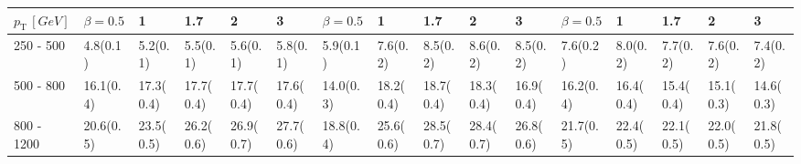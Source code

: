 \begin{table}
{\begin{tabular}{llllllllllllllll}
\multicolumn{1}{l||}{$p_{\mathrm{T}} \, [GeV]$} & \multicolumn{1}{l|}{\cellcolor{Gray2}$\beta=0.5$} & \multicolumn{1}{l|}{\cellcolor{Gray2}1}        & \multicolumn{1}{l|}{\cellcolor{Gray2}1.7}    & \multicolumn{1}{l|}{\cellcolor{Gray2}2}    & \multicolumn{1}{l||}{\cellcolor{Gray2}3}    & \multicolumn{1}{l|}{\cellcolor{Gray2}$\beta=0.5$} & \multicolumn{1}{l|}{\cellcolor{Gray2}1}    & \multicolumn{1}{l|}{\cellcolor{Gray2}1.7}  & \multicolumn{1}{l|}{\cellcolor{Gray2}2}    & \multicolumn{1}{l||}{\cellcolor{Gray2}3}    & \multicolumn{1}{l|}{\cellcolor{Gray2}$\beta=0.5$} & \multicolumn{1}{l|}{\cellcolor{Gray2}1}    & \multicolumn{1}{l|}{\cellcolor{Gray2}1.7}  & \multicolumn{1}{l|}{\cellcolor{Gray2}2}    & \multicolumn{1}{l|}{\cellcolor{Gray2}3}    \\ \hline \hline
\multicolumn{1}{l||}{250 - 500}      & \multicolumn{1}{l|}{4.8(0.1)}         & \multicolumn{1}{l|}{5.2(0.1)}  & \multicolumn{1}{l|}{5.5(0.1)}        & \multicolumn{1}{l|}{5.6(0.1)}  				& \multicolumn{1}{l||}{5.8(0.1)}    & \multicolumn{1}{l|}{5.9(0.1)}         	& \multicolumn{1}{l|}{7.6(0.2)}  	& \multicolumn{1}{l|}{8.5(0.2)}  	& \multicolumn{1}{l|}{\cellcolor{Red!50}8.6(0.2)}  		        & \multicolumn{1}{l||}{8.5(0.2)}  							& \multicolumn{1}{l|}{7.6(0.2)}         & \multicolumn{1}{l|}{8.0(0.2)}  &   \multicolumn{1}{l|}{7.7(0.2)}  &   \multicolumn{1}{l|}{7.6(0.2)}  & \multicolumn{1}{l|}{7.4(0.2)}  \\
\multicolumn{1}{l||}{500 - 800}      & \multicolumn{1}{l|}{16.1(0.4)}        & \multicolumn{1}{l|}{17.3(0.4)} & \multicolumn{1}{l|}{17.7(0.4)} 	     & \multicolumn{1}{l|}{17.7(0.4)} 				& \multicolumn{1}{l||}{17.6(0.4)} 	& \multicolumn{1}{l|}{14.0(0.3)}        	& \multicolumn{1}{l|}{18.2(0.4)} 	& \multicolumn{1}{l|}{\cellcolor{Red!50}18.7(0.4)} 		& \multicolumn{1}{l|}{18.3(0.4)} 						& \multicolumn{1}{l||}{16.9(0.4)} 							& \multicolumn{1}{l|}{16.2(0.4)}        & \multicolumn{1}{l|}{16.4(0.4)} & 	 \multicolumn{1}{l|}{15.4(0.4)} & 	\multicolumn{1}{l|}{15.1(0.3)} & \multicolumn{1}{l|}{14.6(0.3)} \\
\multicolumn{1}{l||}{800 - 1200}     & \multicolumn{1}{l|}{20.6(0.5)}        & \multicolumn{1}{l|}{23.5(0.5)} & \multicolumn{1}{l|}{26.2(0.6)} 		 & \multicolumn{1}{l|}{26.9(0.7)} 				& \multicolumn{1}{l||}{27.7(0.6)} 	& \multicolumn{1}{l|}{18.8(0.4)}        	& \multicolumn{1}{l|}{25.6(0.6)} 	& \multicolumn{1}{l|}{\cellcolor{Red!50}28.5(0.7)} 		& \multicolumn{1}{l|}{28.4(0.7)} 						& \multicolumn{1}{l||}{26.8(0.6)} 							& \multicolumn{1}{l|}{21.7(0.5)}        & \multicolumn{1}{l|}{22.4(0.5)} & 	 \multicolumn{1}{l|}{22.1(0.5)} & 	\multicolumn{1}{l|}{22.0(0.5)} & \multicolumn{1}{l|}{21.8(0.5)} \\

\end{tabular}}
\end{table}
